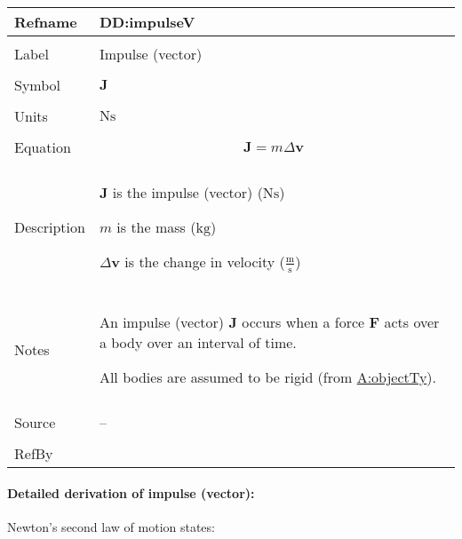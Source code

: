 \documentclass[12pt]{article}
\begin{document}
\vspace{\baselineskip}
\noindent
\begin{minipage}{\textwidth}
\begin{tabular}{>{\raggedright}p{}>{\raggedright\arraybackslash}p{}}
\toprule \textbf{Refname} & \textbf{DD:impulseV}
\label{DD:impulseV}
\\ \midrule \\
Label & Impulse (vector)
        
\\ \midrule \\
Symbol & $\symbf{J}$
         
\\ \midrule \\
Units & $\text{N}\text{s}$
        
\\ \midrule \\
Equation & \begin{displaymath}
           \symbf{J}=m Δ\symbf{v}
           \end{displaymath}
\\ \midrule \\
Description & \begin{symbDescription}
              \item{$\symbf{J}$ is the impulse (vector) ($\text{N}\text{s}$)}
              \item{$m$ is the mass (${\text{kg}}$)}
              \item{$Δ\symbf{v}$ is the change in velocity ($\frac{\text{m}}{\text{s}}$)}
              \end{symbDescription}
\\ \midrule \\
Notes & An impulse (vector) $\symbf{J}$ occurs when a force $\symbf{F}$ acts over a body over an interval of time.
        
        All bodies are assumed to be rigid (from \hyperref[assumpOT]{A:objectTy}).
        
\\ \midrule \\
Source & --
         
\\ \midrule \\
RefBy & 
\\ \bottomrule
\end{tabular}
\end{minipage}
\paragraph{Detailed derivation of impulse (vector):}
\label{DD:impulseVDeriv}
Newton's second law of motion states:
\end{document}
